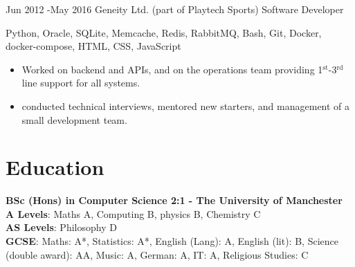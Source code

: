 \documentclass[10pt]{article} %
\begin{document}
\jobheader
{Jun 2012 -}{May 2016}
{Geneity Ltd. (part of Playtech Sports)}
{Software Developer}
{
      Python,
      Oracle, SQLite,
      Memcache, Redis,
      RabbitMQ,
      Bash,
      Git,
      Docker, docker-compose,
      HTML, CSS, JavaScript
    
}
  \begin{itemize}

  \item Worked on backend and APIs, and on the operations team providing
        1$^{\textrm{st}}$-3$^{\textrm{rd}}$ line support for all systems.

  \item conducted technical interviews, mentored new starters, and management of a small
        development team. 

  \end{itemize}



\section{Education}

\textbf{BSc (Hons) in Computer Science 2:1 - The University of Manchester}
\\
\textbf{A Levels}: Maths A, Computing B, physics B, Chemistry C
\\
\textbf{AS Levels}: Philosophy D
\\
\textbf{GCSE}:
   Maths: A*,
   Statistics: A*,
   English (Lang): A,
   English (lit): B,
   Science (double award): AA,
   Music: A,
   German: A,
   IT: A,
   Religious Studies: C



\end{document}
